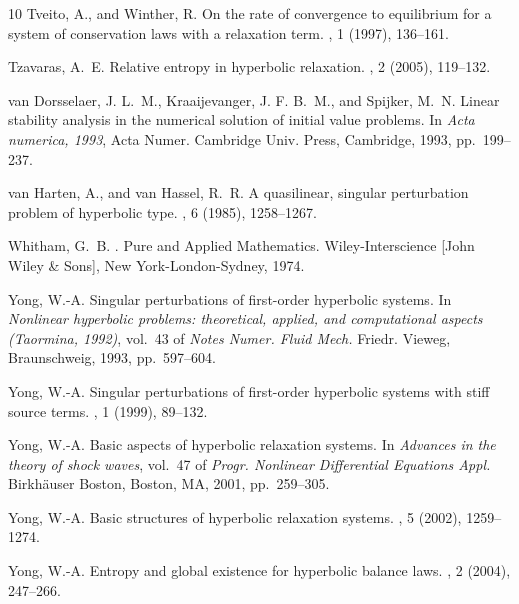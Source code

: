 \documentclass{article}
\theoremstyle{plain}%
\theoremstyle{definition}%
\theoremstyle{remark}%
\newcommand{\+}[1]{{\bm{#1}}}
\begin{document}
\begin{thebibliography}{10}
  {\sc Tveito, A., and Winther, R.}
  \newblock On the rate of convergence to equilibrium for a system of
    conservation laws with a relaxation term.
  , 1 (1997), 136--161.
  
  {\sc Tzavaras, A.~E.}
  \newblock Relative entropy in hyperbolic relaxation.
  , 2 (2005), 119--132.
  
  {\sc van Dorsselaer, J. L.~M., Kraaijevanger, J. F. B.~M., and Spijker, M.~N.}
  \newblock Linear stability analysis in the numerical solution of initial value
    problems.
  \newblock In {\em Acta numerica, 1993}, Acta Numer. Cambridge Univ. Press,
    Cambridge, 1993, pp.~199--237.
  
  {\sc van Harten, A., and van Hassel, R.~R.}
  \newblock A quasilinear, singular perturbation problem of hyperbolic type.
  , 6 (1985), 1258--1267.
  
  {\sc Whitham, G.~B.}
  .
  \newblock Pure and Applied Mathematics. Wiley-Interscience [John Wiley \&
    Sons], New York-London-Sydney, 1974.
  
  {\sc Yong, W.-A.}
  \newblock Singular perturbations of first-order hyperbolic systems.
  \newblock In {\em Nonlinear hyperbolic problems: theoretical, applied, and
    computational aspects ({T}aormina, 1992)}, vol.~43 of {\em Notes Numer. Fluid
    Mech.} Friedr. Vieweg, Braunschweig, 1993, pp.~597--604.
  
  {\sc Yong, W.-A.}
  \newblock Singular perturbations of first-order hyperbolic systems with stiff
    source terms.
  , 1 (1999), 89--132.
  
  {\sc Yong, W.-A.}
  \newblock Basic aspects of hyperbolic relaxation systems.
  \newblock In {\em Advances in the theory of shock waves}, vol.~47 of {\em
    Progr. Nonlinear Differential Equations Appl.} Birkh\"{a}user Boston, Boston,
    MA, 2001, pp.~259--305.
  
  {\sc Yong, W.-A.}
  \newblock Basic structures of hyperbolic relaxation systems.
  , 5 (2002), 1259--1274.
  
  {\sc Yong, W.-A.}
  \newblock Entropy and global existence for hyperbolic balance laws.
  , 2 (2004), 247--266.
  

\end{thebibliography}
\end{document}
